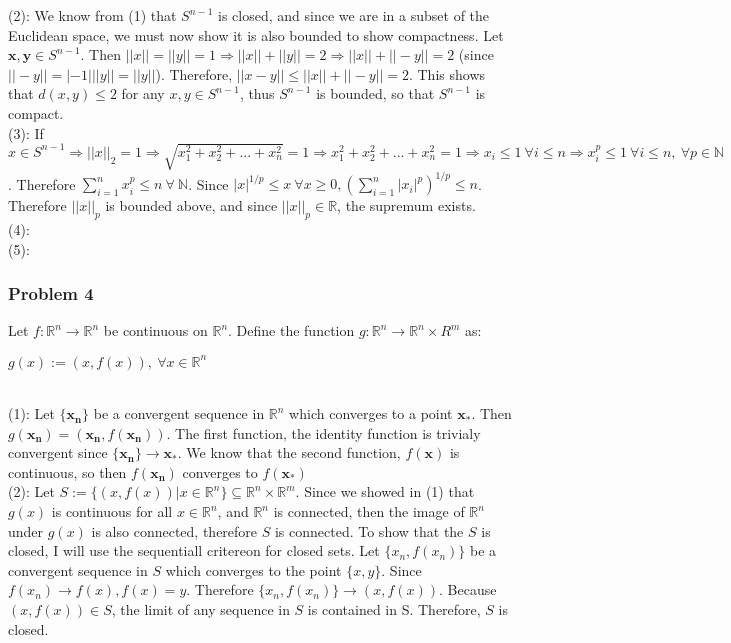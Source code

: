\documentclass[10pt,a4paper]{article}
\newcommand{\N}{\mathbb{N}}
\newcommand{\R}{\mathbb{R}}
\begin{document}
(2): We know from (1) that $S^{n-1}$ is closed, and since we are in a subset of the Euclidean space, we must now show it is also bounded to show compactness. Let $\mathbf{x}, \mathbf{y} \in S^{n-1}$. Then $||x|| = ||y|| = 1 \Rightarrow ||x|| + ||y|| = 2 \Rightarrow ||x|| + ||-y|| = 2$ (since $||-y|| = |-1|||y|| = ||y||$). Therefore, $||x - y|| \leq ||x|| + ||-y|| = 2$. This shows that $d(x, y) \leq 2$ for any $x, y \in S^{n-1}$, thus $S^{n-1}$ is bounded, so that $S^{n-1}$ is compact.\\

(3): If $x \in S^{n-1} \Rightarrow ||x||_2 = 1 \Rightarrow \sqrt{x_1^2 + x_2^2 +...+ x_n^2} = 1 \Rightarrow x_1^2 + x_2^2 +...+ x_n^2 = 1 \Rightarrow x_i \leq 1 \ \forall i \leq n \Rightarrow x_i^p \leq 1 \ \forall i \leq n, \ \forall p \in \N$. Therefore $\sum_{i = 1}^n x_i^p \leq n \ \forall\ \N$. Since $|x|^{1/p} \leq x \ \forall x \geq 0, (\sum_{i = 1}^n |x_i|^p)^{1/p} \leq n$. Therefore $||x||_p$ is bounded above, and since $||x||_p \in \R$, the supremum exists.\\

(4):\\

(5):\\

\subsubsection{Problem 4}
Let $f: \R^n \rightarrow \R^n$ be continuous on $\R^n$. Define the function $g: \R^n \rightarrow \R^n \times R^m$ as:
\centerline{$g(x):= (x, f(x)), \ \forall x \in \R^n$}\\

(1): Let $\{\mathbf{x_n}\}$ be a convergent sequence in $\R^n$ which converges to a point $\mathbf{x_*}$. Then $g(\mathbf{x_n}) = (\mathbf{x_n}, f(\mathbf{x_n}))$. The first function, the identity function is trivialy convergent since $\{\mathbf{x_n}\} \rightarrow \mathbf{x_*}$. We know that the second function, $f(\mathbf{x})$ is continuous, so then $f(\mathbf{x_n})$ converges to $f(\mathbf{x_*})$\\

\noindent (2): Let $S := \{(x, f(x))|x \in \R^n\} \subseteq \R^n \times \R^m$. Since we showed in (1) that $g(x)$ is continuous for all $x \in \R^n$, and $\R^n$ is connected, then the image of $\R^n$ under $g(x)$ is also connected, therefore $S$ is connected. To show that the $S$ is closed, I will use the sequentiall critereon for closed sets. Let $\{x_n, f(x_n)\}$ be a convergent sequence in $S$ which converges to the point $\{x, y\}$. Since $f(x_n) \rightarrow f(x), f(x) = y$. Therefore $\{x_n, f(x_n)\} \rightarrow (x, f(x))$. Because $(x, f(x)) \in S$, the limit of any sequence in $S$ is contained in S. Therefore, $S$ is closed.
\end{document}
